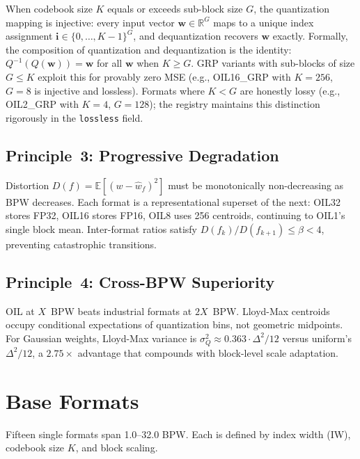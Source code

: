 When codebook size $K$ equals or exceeds sub-block size $G$, the
quantization mapping is injective: every input vector
$\mathbf{w} \in \mathbb{R}^G$ maps to a unique index assignment
$\mathbf{i} \in \{0,\ldots,K-1\}^G$, and dequantization recovers
$\mathbf{w}$ exactly. Formally, the composition of quantization and
dequantization is the identity: $Q^{-1}(Q(\mathbf{w})) = \mathbf{w}$
for all $\mathbf{w}$ when $K \geq G$. GRP variants with sub-blocks of
size $G \leq K$ exploit this for provably zero MSE (e.g., OIL16\_GRP
with $K=256$, $G=8$ is injective and lossless). Formats where
$K < G$ are honestly lossy (e.g., OIL2\_GRP with $K=4$, $G=128$);
the registry maintains this distinction rigorously in the
\texttt{lossless} field.

\subsection{Principle~3: Progressive Degradation}

Distortion $D(f) = \mathbb{E}[(w - \hat{w}_f)^2]$ must be
monotonically non-decreasing as BPW decreases. Each format is a
representational superset of the next: OIL32 stores FP32, OIL16 stores
FP16, OIL8 uses 256 centroids, continuing to OIL1's single block mean.
Inter-format ratios satisfy $D(f_k) / D(f_{k+1}) \leq \beta < 4$,
preventing catastrophic transitions.

\subsection{Principle~4: Cross-BPW Superiority}

OIL at $X$~BPW beats industrial formats at $2X$~BPW. Lloyd-Max
centroids occupy conditional expectations of quantization bins, not
geometric midpoints. For Gaussian weights, Lloyd-Max variance is
$\sigma_Q^2 \approx 0.363 \cdot \Delta^2 / 12$ versus uniform's
$\Delta^2/12$, a $2.75\times$ advantage that compounds with block-level
scale adaptation.

\section{Base Formats}
\label{sec:base_formats}

Fifteen single formats span 1.0--32.0 BPW. Each is defined by index width
(IW), codebook size $K$, and block scaling.

